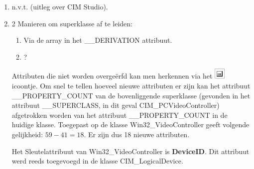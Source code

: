 \documentclass{report}
\begin{document}
	\begin{enumerate}
		\item n.v.t. (uitleg over CIM Studio).
		\item 2 Manieren om superklasse af te leiden:
			\begin{enumerate}
				\item Via de array in het \_\_DERIVATION attribuut.
				\item ?
			\end{enumerate}
			Attributen die niet worden overgeërfd kan men herkennen via het \includegraphics{attribuuticoon} icoontje. Om snel te tellen hoeveel nieuwe attributen er zijn kan het attribuut \_\_PROPERTY\_COUNT van de bovenliggende superklasse (gevonden in het attribuut \_\_SUPERCLASS, in dit geval CIM\_PCVideoController) afgetrokken worden van het attribuut \_\_PROPERTY\_COUNT in de huidige klasse. Toegepast op de klasse Win32\_VideoController geeft volgende gelijkheid: $59 - 41 = 18$. Er zijn dus 18 nieuwe attributen.
			
			Het Sleutelattribuut van Win32\_VideoController is \textbf{DeviceID}. Dit attribuut werd reeds toegevoegd in de klasse CIM\_LogicalDevice.
			

\end{enumerate}
\end{document}
